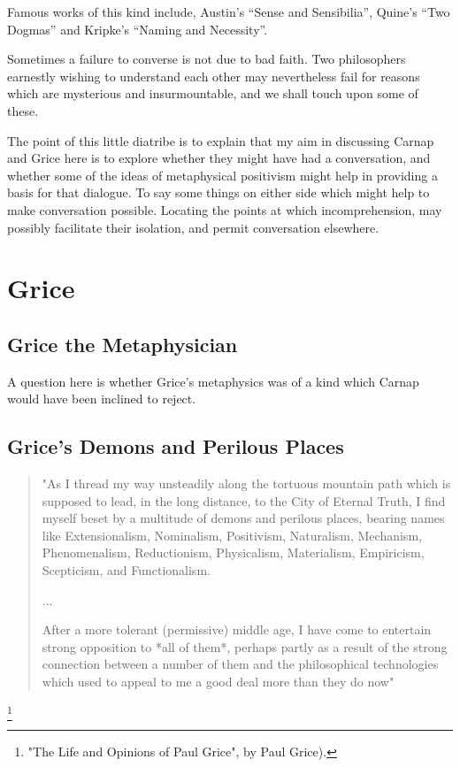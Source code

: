 \documentclass[10pt,titlepage]{book}
\begin{document}
Famous works of this kind include, Austin's ``Sense and Sensibilia'', Quine's ``Two Dogmas'' and Kripke's ``Naming and Necessity''.

Sometimes a failure to converse is not due to bad faith.
Two philosophers earnestly wishing to understand each other may nevertheless fail for reasons which are mysterious and insurmountable, and we shall touch upon some of these.

The point of this little diatribe is to explain that my aim in discussing Carnap and Grice here is to explore whether they might have had a conversation, and whether some of the ideas of metaphysical positivism might help in providing a basis for that dialogue.
To say some things on either side which might help to make conversation possible.
Locating the points at which incomprehension, may possibly facilitate their isolation, and permit conversation elsewhere.

\chapter{Grice}

\section{Grice the Metaphysician}

A question here is whether Grice's metaphysics was of a kind which Carnap would have been inclined to reject.

\section{Grice's Demons and Perilous Places}

\begin{quote}
"As I thread my way unsteadily along the   tortuous mountain 
path which is supposed to lead, in the long  distance,  
to the City of Eternal Truth, I find myself beset by a  
multitude of demons and perilous places, bearing names like  
Extensionalism, Nominalism, Positivism, Naturalism, Mechanism,  
Phenomenalism, Reductionism, Physicalism, Materialism,  
Empiricism, Scepticism, and Functionalism. 

...

After a more tolerant (permissive)  middle age, I have come to  
entertain strong opposition to *all of them*, 
perhaps partly as a result of the strong connection between a  number 
of them and the philosophical technologies which used to appeal  
to me a good deal more than they do  now"
\end{quote}
\footnote{"The Life and Opinions of Paul Grice", by Paul Grice).}
\end{document}
